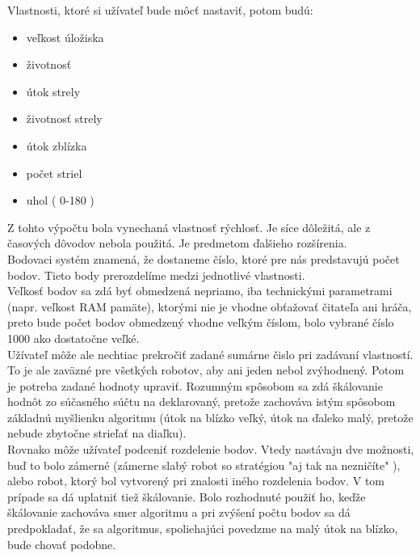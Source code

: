 Vlastnosti, ktoré si užívateľ bude môcť nastaviť, potom budú:
\begin{itemize}
\item veľkost úložiska
\item životnosť
\item útok strely
\item životnosť strely
\item útok zblízka
\item počet striel
\item uhol ( 0-180 )
\end{itemize}
Z tohto výpočtu bola vynechaná vlastnosť rýchlosť. Je síce dôležitá, ale z časových dôvodov nebola použitá. Je predmetom ďalšieho rozšírenia. \\
Bodovaci systém znamená, že dostaneme číslo, ktoré pre nás predstavujú počet bodov. Tieto body prerozdelíme medzi jednotlivé vlastnosti.\\
Veľkosť bodov sa zdá byť obmedzená nepriamo, iba technickými parametrami (napr. veľkost RAM pamäte), ktorými nie je vhodne obťažovať čitateľa ani hráča, preto bude počet bodov obmedzený vhodne veľkým číslom, bolo vybrané číslo 1000 ako dostatočne veľké. \\
\indent Užívateľ môže ale nechtiac prekročiť zadané sumárne čislo pri zadávaní vlastností. To je ale zaväzné pre všetkých robotov, aby ani jeden nebol zvýhodnený. Potom je potreba zadané hodnoty upraviť. Rozumným spôsobom sa zdá škálovanie hodnôt zo súčasného súčtu na deklarovaný, pretože zachováva istým spôsobom základnú myšlienku algoritmu (útok na blízko veľký, útok na ďaleko malý, pretože nebude zbytočne strieľať na diaľku).\\
Rovnako môže užívateľ podceniť rozdelenie bodov. Vtedy nastávaju dve možnosti, buď to bolo zámerné (zámerne slabý robot so stratégiou "aj tak na nezničíte" ), alebo robot, ktorý bol vytvorený pri znalosti iného rozdelenia bodov. V tom prípade sa dá uplatniť tiež škálovanie. Bolo rozhodnuté použiť ho, keďže škálovanie zachováva smer algoritmu a pri zvýšení počtu bodov sa dá predpokladať, že sa algoritmus, spoliehajúci povedzme na malý útok na blízko, bude chovať podobne.\\

